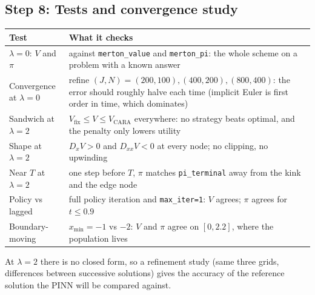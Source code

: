 \documentclass[11pt]{article}
\begin{document}
\subsection*{Step 8: Tests and convergence study}
\begin{center}
\small
\begin{tabular}{@{}p{}p{}@{}}
\toprule
Test & What it checks \\
\midrule
$\lambda=0$: $V$ and $\pi$ & against \texttt{merton\_value} and \texttt{merton\_pi}: the whole
  scheme on a problem with a known answer \\
Convergence at $\lambda=0$ & refine $(J,N)=(200,100),(400,200),(800,400)$: the error should
  roughly halve each time (implicit Euler is first order in time, which dominates) \\
Sandwich at $\lambda=2$ & $V_{\text{fix}}\le V\le V_{\text{CARA}}$ everywhere: no strategy
  beats optimal, and the penalty only lowers utility \\
Shape at $\lambda=2$ & $D_xV>0$ and $D_{xx}V<0$ at every node; no clipping, no upwinding \\
Near $T$ at $\lambda=2$ & one step before $T$, $\pi$ matches \texttt{pi\_terminal} away from
  the kink and the edge node \\
Policy vs lagged & full policy iteration and \texttt{max\_iter=1}: $V$ agrees; $\pi$ agrees for
  $t\le0.9$ \\
Boundary-moving & $x_{\min}=-1$ vs $-2$: $V$ and $\pi$ agree on $[0,2.2]$, where the
  population lives \\
\bottomrule
\end{tabular}
\end{center}
At $\lambda=2$ there is no closed form, so a refinement study (same three grids, differences
between successive solutions) gives the accuracy of the reference solution the PINN will be
compared against.
\end{document}

